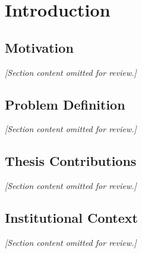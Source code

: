 \chapter{Introduction}
\label{ch:introduction}

\section{Motivation}
\textit{[Section content omitted for review.]}

\section{Problem Definition}
\textit{[Section content omitted for review.]}

\section{Thesis Contributions}
\textit{[Section content omitted for review.]}

\section{Institutional Context}
\textit{[Section content omitted for review.]}

